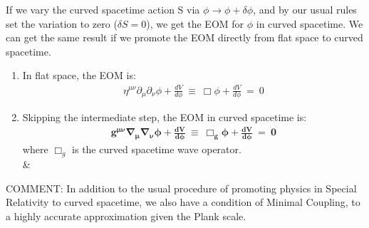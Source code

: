 \documentclass[10pt]{article}
\begin{document}
                If we vary the curved spacetime action S via $\phi \to \phi + \delta \phi$, and by our usual rules set the variation to zero ($\delta S = 0$), we get the EOM for $\phi$ in curved spacetime. We can get the same result if we promote the EOM directly from flat space to curved spacetime.  
                \begin{enumerate}
                    \item In flat space, the EOM is:
                        \begin{align}
                            \eta^{\mu \nu} \partial_{\mu} \partial_{\nu}\phi + \frac{dV}{d\phi}\ \equiv \ \Box \phi + \frac{dV}{d\phi} \ = \ 0
                        \end{align}
                    \item Skipping the intermediate step, the EOM in curved spacetime is:
                        \begin{align}
                            \boldsymbol{g^{\mu \nu} \nabla_{\mu} \nabla_{\nu}\phi + \frac{dV}{d\phi} \ \equiv \ \Box_{g} \phi + \frac{dV}{d\phi} \ = \ 0 }
                        \end{align}
                    where $\Box_{g}$ is the curved spacetime wave operator.\\ & \\
                \end{enumerate}
            COMMENT: In addition to the usual procedure of promoting physics in Special Relativity to curved spacetime, we also have a condition of Minimal Coupling, to a highly accurate approximation given the Plank scale. 

        
\end{document}
